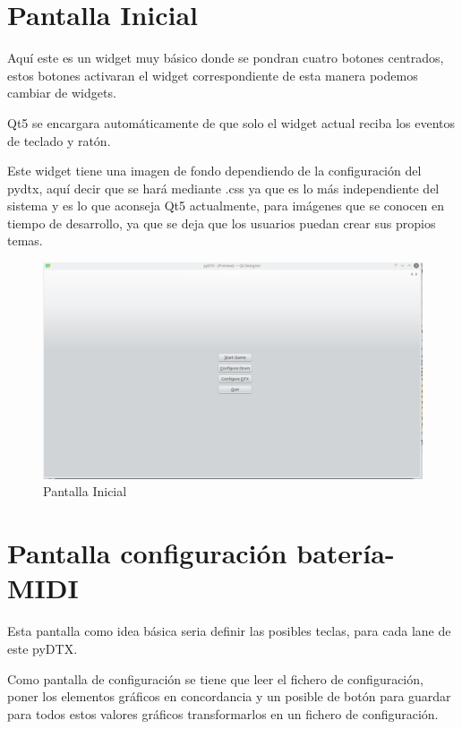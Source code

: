 \documentclass[a4paper,11pt,oneside]{book}
\begin{document}
 
\section{Pantalla Inicial}
Aquí este es un widget muy básico donde se pondran cuatro botones centrados, estos botones activaran el widget correspondiente de esta manera podemos cambiar de widgets.


Qt5 se encargara automáticamente de que solo el widget actual reciba los eventos de teclado y ratón.

Este widget tiene una imagen de fondo dependiendo de la configuración del pydtx, aquí decir que se hará mediante .css ya que es lo más independiente del sistema y es lo que aconseja Qt5 actualmente, para imágenes que se conocen en tiempo de desarrollo, ya que se deja que los usuarios puedan crear sus propios temas.

\begin{figure}[H]
\begin{center}
\includegraphics[scale=0.4]{Imagenes/Main_window.png}
\caption{Pantalla Inicial}
\label{Pantalla Inicial}
\end{center}
\end{figure}


\section{Pantalla configuración batería-MIDI}
Esta pantalla como idea básica seria definir las posibles teclas, para cada lane de este pyDTX.

Como pantalla de configuración se tiene que leer el fichero de configuración, poner los elementos gráficos en concordancia y un posible de botón para guardar para todos estos valores gráficos transformarlos en un fichero de configuración.
\end{document}
